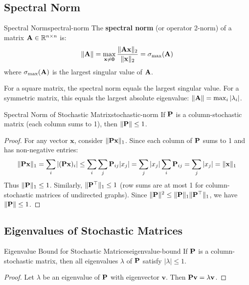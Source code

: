 \begin{notechapter}
\subsection{Spectral Norm}
\label{random-walk-similarity:app:spectral-norm}

\begin{definition}{Spectral Norm}{spectral-norm}
The \textbf{spectral norm} (or operator 2-norm) of a matrix $\mathbf{A} \in \mathbb{R}^{n \times n}$ is:
\[
\|\mathbf{A}\| = \max_{\mathbf{x} \neq \mathbf{0}} \frac{\|\mathbf{A} \mathbf{x}\|_2}{\|\mathbf{x}\|_2} = \sigma_{\max}(\mathbf{A})
\]
where $\sigma_{\max}(\mathbf{A})$ is the largest singular value of $\mathbf{A}$.
\end{definition}

For a square matrix, the spectral norm equals the largest singular value. For a symmetric matrix, this equals the largest absolute eigenvalue: $\|\mathbf{A}\| = \max_i |\lambda_i|$.

\begin{proposition}{Spectral Norm of Stochastic Matrix}{stochastic-norm}
If $\mathbf{P}$ is a column-stochastic matrix (each column sums to 1), then $\|\mathbf{P}\| \leq 1$.
\end{proposition}

\begin{proof}
For any vector $\mathbf{x}$, consider $\|\mathbf{P}\mathbf{x}\|_1$. Since each column of $\mathbf{P}$ sums to 1 and has non-negative entries:
\[
\|\mathbf{P}\mathbf{x}\|_1 = \sum_i |(\mathbf{P}\mathbf{x})_i| \leq \sum_i \sum_j \mathbf{P}_{ij} |x_j| = \sum_j |x_j| \sum_i \mathbf{P}_{ij} = \sum_j |x_j| = \|\mathbf{x}\|_1
\]
Thus $\|\mathbf{P}\|_1 \leq 1$. Similarly, $\|\mathbf{P}^\top\|_1 \leq 1$ (row sums are at most 1 for column-stochastic matrices of undirected graphs). Since $\|\mathbf{P}\|^2 \leq \|\mathbf{P}\|_1 \|\mathbf{P}^\top\|_1$, we have $\|\mathbf{P}\| \leq 1$.
\end{proof}

\subsection{Eigenvalues of Stochastic Matrices}
\label{random-walk-similarity:app:eigenvalues}

\begin{proposition}{Eigenvalue Bound for Stochastic Matrices}{eigenvalue-bound}
If $\mathbf{P}$ is a column-stochastic matrix, then all eigenvalues $\lambda$ of $\mathbf{P}$ satisfy $|\lambda| \leq 1$.
\end{proposition}

\begin{proof}
Let $\lambda$ be an eigenvalue of $\mathbf{P}$ with eigenvector $\mathbf{v}$. Then $\mathbf{P}\mathbf{v} = \lambda \mathbf{v}$.


\end{proof}
\end{notechapter}
